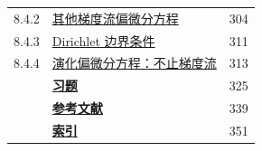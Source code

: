 \begin{longtable}{@{}p{1.4cm}p{11.2cm}r@{}}
8.4.2&\hyperref[sec:8.4.2]{\hspace{1em}其他梯度流偏微分方程}&304\\
8.4.3&\hyperref[sec:8.4.3]{\hspace{1em}Dirichlet 边界条件}&311\\
8.4.4&\hyperref[sec:8.4.4]{\hspace{1em}演化偏微分方程：不止梯度流}&313\\
&\hyperref[sec:exercises]{\textbf{习题}}&325\\
&\hyperref[sec:references]{\textbf{参考文献}}&339\\
&\hyperref[sec:index]{\textbf{索引}}&351\\
\end{longtable}
\endgroup
